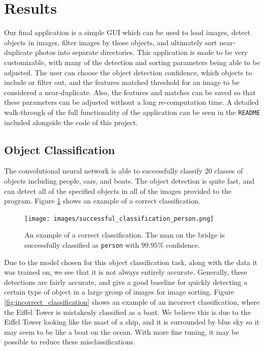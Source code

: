 \documentclass[12pt]{article}
\begin{document}
\section{Results}
Our final application is a simple GUI which can be used to load images, detect objects in images, filter images by those objects, and ultimately sort near-duplicate photos into separate directories. This application is made to be very customizable, with many of the detection and sorting parameters being able to be adjusted. The user can choose the object detection confidence, which objects to include or filter out, and the features matched threshold for an image to be considered a near-duplicate. Also, the features and matches can be saved so that these parameters can be adjusted without a long re-computation time. A detailed walk-through of the full functionality of the application can be seen in the \texttt{README} included alongside the code of this project.

\subsection{Object Classification}
The convolutional neural network is able to successfully classify 20 classes of objects including people, cars, and boats. The object detection is quite fast, and can detect all of the specified objects in all of the images provided to the program. Figure \ref{fig:correct_classification} shows an example of a correct classification.
\begin{figure}[H]
	\centering
	\texttt{[image: images/successful\_classification\_person.png]}
	\caption{An example of a correct classification. The man on the bridge is successfully classified as \texttt{person} with $99.95\%$ confidence.}
	\label{fig:correct_classification}
\end{figure}

Due to the model chosen for this object classification task, along with the data it was trained on, we see that it is not always entirely accurate. Generally, these detections are fairly accurate, and give a good baseline for quickly detecting a certain type of object in a large group of images for image sorting. Figure \ref{fig:incorrect_classification} shows an example of an incorrect classification, where the Eiffel Tower is mistakenly classified as a boat. We believe this is due to the Eiffel Tower looking like the mast of a ship, and it is surrounded by blue sky so it may seem to be like a boat on the ocean. With more fine tuning, it may be possible to reduce these misclassifications.
\end{document}
